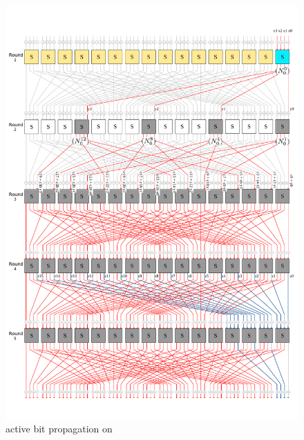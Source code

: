 \begin{figure}[!h]
	\centering
	\includegraphics[width=\linewidth]{fig/present_cipher_active_bit_propagation.pdf}
	\caption{active bit propagation on \present}
	\label{fig:present_active_bit_propagation}
\end{figure}


